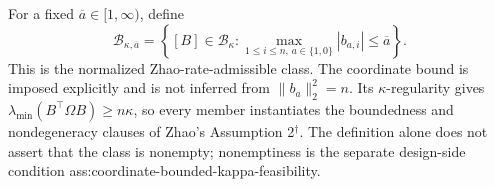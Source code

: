 For a fixed \(\overline a\in[1,\infty)\), define
\[
\mathcal B_{\kappa,\overline a}
=\left\{[B]\in\mathcal B_\kappa:
\max_{1\le i\le n,\,a\in\{1,0\}}|b_{a,i}|\le\overline a\right\}.
\]
This is the normalized Zhao-rate-admissible class.  The coordinate bound is imposed explicitly and is not inferred from \(\lVert b_a\rVert_2^2=n\).  Its \(\kappa\)-regularity gives \(\lambda_{\min}(B^{\top}\Omega B)\ge n\kappa\), so every member instantiates the boundedness and nondegeneracy clauses of Zhao's Assumption 2\(^{\dagger}\).  The definition alone does not assert that the class is nonempty; nonemptiness is the separate design-side condition ass:coordinate-bounded-kappa-feasibility.